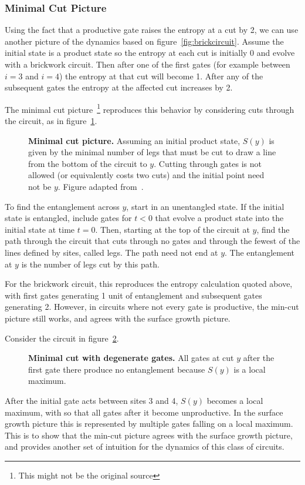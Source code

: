 \subsubsection{Minimal Cut Picture} \label{subsub:mincut}

Using the fact that a productive gate raises the entropy at a cut by 2, we can use another picture of the dynamics based on figure~\ref{fig:brickcircuit}. Assume the initial state is a product state so the entropy at each cut is initially 0 and evolve with a brickwork circuit. Then after one of the first gates (for example between $i=3$ and $i=4$) the entropy at that cut will become 1. After any of the subsequent gates the entropy at the affected cut increases by 2.

The minimal cut picture~\cite{Nahum2017}\footnote{This might not be the original source} reproduces this behavior by considering cuts through the circuit, as in figure~\ref{fig:mincut}.
\begin{figure}
	\centering
	
	\caption{\textbf{Minimal cut picture.} Assuming an initial product state, $S(y)$ is given by the minimal number of legs that must be cut to draw a line from the bottom of the circuit to $y$. Cutting through gates is not allowed (or equivalently costs two cuts) and the initial point need not be $y$. Figure adapted from~\cite{Nahum2017}.}
	\label{fig:mincut}
\end{figure}
To find the entanglement across $y$, start in an unentangled state. If the initial state is entangled, include gates for $t<0$ that evolve a product state into the initial state at time $t=0$. Then, starting at the top of the circuit at $y$, find the path through the circuit that cuts through no gates and through the fewest of the lines defined by sites, called legs. The path need not end at $y$. The entanglement at $y$ is the number of legs cut by this path. 

For the brickwork circuit, this reproduces the entropy calculation quoted above, with first gates generating 1 unit of entanglement and subsequent gates generating 2. However, in circuits where not every gate is productive, the min-cut picture still works, and agrees with the surface growth picture.

Consider the circuit in figure~\ref{fig:degeneratemincut}.
\begin{figure}
	\centering
	
	\caption{\textbf{Minimal cut with degenerate gates.} All gates at cut $y$ after the first gate there produce no entanglement because $S(y)$ is a local maximum.}
	\label{fig:degeneratemincut}
\end{figure}
After the initial gate acts between sites 3 and 4, $S(y)$ becomes a local maximum, with so that all gates after it become unproductive. In the surface growth picture this is represented by multiple gates falling on a local maximum. This is to show that the min-cut picture agrees with the surface growth picture, and provides another set of intuition for the dynamics of this class of circuits.

